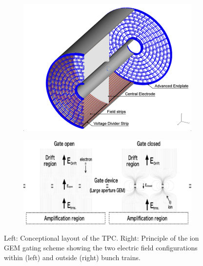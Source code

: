 \begin{figure}[t!]
\begin{subfigure}{0.45\textwidth}
\includegraphics[width=1\hsize]{Detector/fig/TPC.png}
\caption{}
\end{subfigure}
\begin{subfigure}{0.45\textwidth}
\includegraphics[width=1\hsize]{Detector/fig/gate.jpg}
\caption{}
\end{subfigure}
\caption[TPC layout]{Left: Conceptional layout of the TPC. Right: Principle of the ion GEM gating scheme showing the two electric field configurations within (left) and outside (right) bunch trains.}
\label{fig:det:TPC}
\end{figure}


